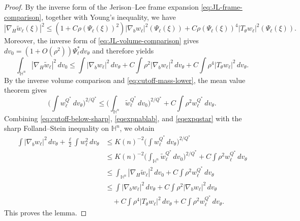 \documentclass[10pt,a4paper]{amsart}
\begin{document}
\begin{proof}
By the inverse form of the Jerison--Lee frame expansion \eqref{eq:JL-frame-comparison}, together with
Young's inequality, we have
\[
|\nabla_H\widetilde w_\ell(\xi)|^2
\le
(1+C\rho(\Psi_\ell(\xi))^2)
|\nabla_bw_\ell|^2(\Psi_\ell(\xi))
+
C\rho(\Psi_\ell(\xi))^4
|T_\theta w_\ell|^2(\Psi_\ell(\xi)).
\]
Moreover, the inverse form of \eqref{eq:JL-volume-comparison} gives
\(
dv_0=(1+O(\rho^2))\Psi_\ell^*dv_\theta
\)
and therefore yields
\begin{equation}\label{eqexpnablab}
\int_{\mathbb H^n}|\nabla_H\widetilde w_\ell|^2\,dv_0
\le
\int |\nabla_bw_\ell|^2\,dv_\theta
+
C\int \rho^2|\nabla_bw_\ell|^2\,dv_\theta  
+
C\int \rho^4|T_\theta w_\ell|^2\,dv_\theta .
\end{equation}
By the inverse volume comparison and
\eqref{eq:cutoff-mass-lower}, the mean value theorem gives
\begin{equation}\label{eqexpqstar}
\Big(\int w_\ell^{Q^*}\,dv_\theta\Big)^{2/Q^*}
\le
\Big(\int_{\mathbb H^n}
\widetilde w_\ell^{Q^*}\,dv_0\Big)^{2/Q^*}+
C\int\rho^2w_\ell^{Q^*}\,dv_\theta.
\end{equation}
Combining \eqref{eq:cutoff-below-sharp},
\eqref{eqexpnablab}, and \eqref{eqexpqstar} with the sharp
Folland--Stein inequality on \(\mathbb H^n\), we obtain
\[
\begin{aligned}
\int |\nabla_bw_\ell|^2\,dv_\theta
+\frac{\ell}{2}\int w_\ell^2\,dv_\theta
&\le
K(n)^{-2}
\Big(\int w_\ell^{Q^*}\,dv_\theta\Big)^{2/Q^*} \\
&\le
K(n)^{-2}
\Big(\int_{\mathbb H^n}\widetilde w_\ell^{Q^*}\,dv_0\Big)^{2/Q^*}
+
C\int\rho^2w_\ell^{Q^*}\,dv_\theta \\
&\le
\int_{\mathbb H^n}|\nabla_H\widetilde w_\ell|^2\,dv_0
+
C\int\rho^2w_\ell^{Q^*}\,dv_\theta \\
&\le
\int |\nabla_bw_\ell|^2\,dv_\theta
+
C\int\rho^2|\nabla_bw_\ell|^2\,dv_\theta \\
&\quad
+
C\int\rho^4|T_\theta w_\ell|^2\,dv_\theta
+
C\int\rho^2w_\ell^{Q^*}\,dv_\theta .
\end{aligned}
\]
This proves the lemma.
\end{proof}
\end{document}
